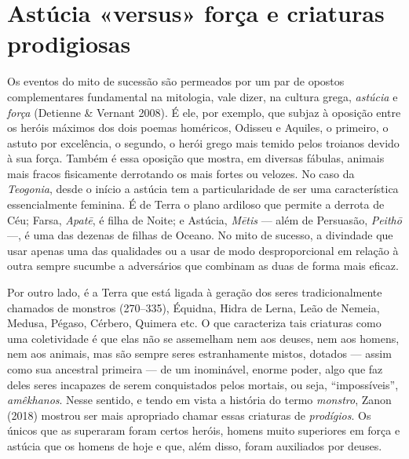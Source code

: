 \section{Astúcia «versus» força e criaturas prodigiosas}

Os eventos do mito de sucessão são permeados por um par de opostos
complementares fundamental na mitologia, vale dizer, na cultura grega,
\textit{astúcia} e \textit{força} (Detienne \& Vernant 2008). É ele, por exemplo,
que subjaz à oposição entre os heróis máximos dos dois poemas homéricos,
Odisseu e Aquiles, o primeiro, o astuto por excelência, o segundo, o
herói grego mais temido pelos troianos devido à sua força. Também é essa
oposição que mostra, em diversas fábulas, animais mais fracos
fisicamente derrotando os mais fortes ou velozes. No caso da
\textit{Teogonia}, desde o início a astúcia tem a particularidade de ser
uma característica essencialmente feminina. É de Terra o plano ardiloso
que permite a derrota de Céu; Farsa, \textit{Apatē}, é filha de Noite; e
Astúcia, \textit{Mētis} --- além de Persuasão, \textit{Peithō} ---, é uma das
dezenas de filhas de Oceano. No mito de sucesso, a divindade que usar
apenas uma das qualidades ou a usar de modo desproporcional em relação à
outra sempre sucumbe a adversários que combinam as duas de forma mais
eficaz.

Por outro lado, é a Terra que está ligada à geração dos seres
tradicionalmente chamados de monstros (270--335), Équidna, Hidra de
Lerna, Leão de Nemeia, Medusa, Pégaso, Cérbero, Quimera etc. O que
caracteriza tais criaturas como uma coletividade é que elas não se
assemelham nem aos deuses, nem aos homens, nem aos animais, mas são sempre
seres estranhamente mistos, dotados --- assim como sua ancestral primeira
--- de um inominável, enorme poder, algo que faz deles seres incapazes de
serem conquistados pelos mortais, ou seja, ``impossíveis'',
\textit{amêkhanos}. Nesse sentido, e tendo em vista a história do termo
\textit{monstro}, Zanon (2018) mostrou ser mais apropriado chamar essas
criaturas de \textit{prodígios}. Os únicos que as superaram foram certos
heróis, homens muito superiores em força e astúcia que os homens de hoje
e que, além disso, foram auxiliados por deuses.

